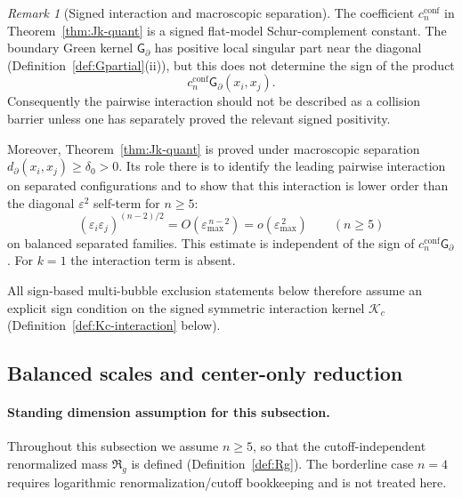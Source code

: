 \documentclass[11pt,reqno,a4paper]{amsart}
\numberwithin{equation}{section}
\theoremstyle{plain}
\theoremstyle{remark}
\newtheorem{remark}[theorem]{Remark}
\theoremstyle{plain}
\begin{document}
\begin{remark}[Signed interaction and macroscopic separation]\label{rem:interaction-sign}
The coefficient $c_n^{\mathrm{conf}}$ in Theorem~\ref{thm:Jk-quant} is a
signed flat-model Schur-complement constant.  The boundary Green kernel
$\mathsf G_\partial$ has positive local singular part near the diagonal
(Definition~\ref{def:Gpartial}(ii)), but this does not determine the sign of
the product
\[
c_n^{\mathrm{conf}}\mathsf G_\partial(x_i,x_j).
\]
Consequently the pairwise interaction should not be described as a collision
barrier unless one has separately proved the relevant signed positivity.

Moreover, Theorem~\ref{thm:Jk-quant} is proved under macroscopic separation
$d_\partial(x_i,x_j)\ge\delta_0>0$.
Its role there is to identify the leading pairwise interaction on separated
configurations and to show that this interaction is lower order than the
diagonal $\varepsilon^2$ self-term for $n\ge5$:
\[
(\varepsilon_i\varepsilon_j)^{(n-2)/2}
=
O(\varepsilon_{\max}^{\,n-2})
=
o(\varepsilon_{\max}^{\,2})
\qquad(n\ge5)
\]
on balanced separated families.  This estimate is independent of the sign of
$c_n^{\mathrm{conf}}\mathsf G_\partial$.
For $k=1$ the interaction term is absent.

All sign-based multi-bubble exclusion statements below therefore assume an
explicit sign condition on the signed symmetric interaction kernel
$\mathcal K_c$ (Definition~\ref{def:Kc-interaction} below).
\end{remark}


\subsection{Balanced scales and center-only reduction}

\paragraph{Standing dimension assumption for this subsection.}
Throughout this subsection we assume $n\ge5$, so that the cutoff-independent renormalized mass
$\mathfrak R_g$ is defined (Definition~\ref{def:Rg}). The borderline case $n=4$ requires logarithmic
renormalization/cutoff bookkeeping and is not treated here.
\end{document}
